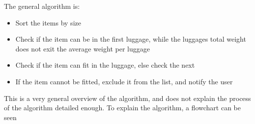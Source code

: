 The general algorithm is:
\begin{itemize}
	\item Sort the items by size
	\item Check if the item can be in the first luggage, while the luggages total weight does not exit the average weight per luggage
	\item	Check if the item can fit in the luggage, else check the next
	\item  If the item cannot be fitted, exclude it from the list, and notify the user
\end{itemize}

This is a very general overview of the algorithm, and does not explain the process of the algorithm detailed enough. To explain the algorithm, a flowchart can be seen